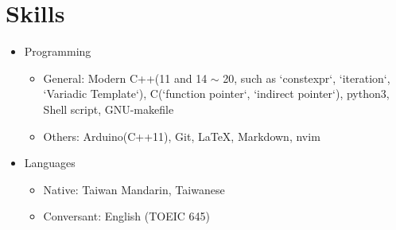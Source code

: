 \section{Skills}
\begin{itemize}
	\item Programming
	\begin{itemize}
        \item General: Modern C++(11 and 14 $\sim$ 20, such as `constexpr`, `iteration`, `Variadic Template`), C(`function pointer`, `indirect pointer`), python3, Shell script, GNU-makefile
		\item Others: Arduino(C++11), Git, \LaTeX , Markdown, nvim
	\end{itemize}
	\item Languages
	\begin{itemize}
		\item Native: Taiwan Mandarin, Taiwanese
		\item Conversant: English (TOEIC 645)
	\end{itemize}
\end{itemize}
